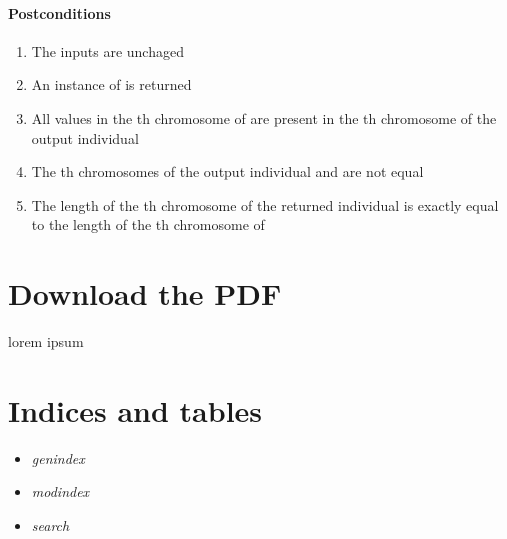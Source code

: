 \documentclass[letterpaper,10pt,english]{sphinxmanual}
\begin{document}
\subsubsection{Postconditions}
\label{contracts:id46}\begin{enumerate}
\item {} 
The inputs are unchaged

\item {} 
An instance of  is returned

\item {} 
All values in the  th chromosome of  are present in the  th chromosome of the output individual

\item {} 
The  th chromosomes of the output individual and  are not equal

\item {} 
The length of the  th chromosome of the returned individual is exactly equal to the length of the  th chromosome of 

\end{enumerate}


\chapter{Download the PDF}
\label{downloadPDF::doc}\label{downloadPDF:download-the-pdf}
lorem ipsum


\chapter{Indices and tables}
\label{index:indices-and-tables}\begin{itemize}
\item {} 
\emph{genindex}

\item {} 
\emph{modindex}

\item {} 
\emph{search}

\end{itemize}



\renewcommand{\indexname}{Index}
\printindex
\end{document}
